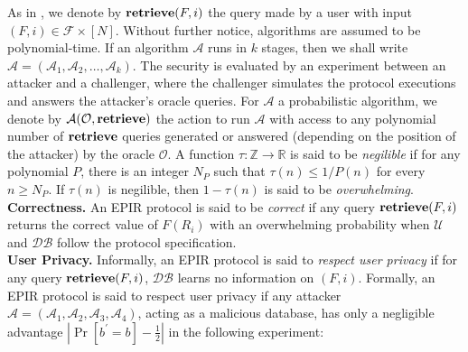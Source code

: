 \documentclass[JMC]{degruyter-journal}
\begin{document}
As in \cite{BC09,BCPT07}, we denote by ${\bf retrieve}(F,i)$ the
query made by a user with input $(F,i)\in \mathcal{F}\times [N]$.
Without further notice, algorithms are assumed to be
polynomial-time. If an algorithm $\mathcal{A}$ runs in $k$
stages,  then we shall write $\mathcal{A} = (\mathcal{A}_1,\mathcal{A}_2,
\ldots, \mathcal{A}_k )$. The security is evaluated by an experiment between an
attacker and a challenger, where the challenger simulates the
protocol executions and answers the attacker's oracle queries.
 For $\mathcal{A}$ a probabilistic algorithm, we denote
by $\mathcal{A}(\mathcal{O}, {\bf retrieve})$
 the action to run $\mathcal{A}$ with access to any polynomial number of ${\bf retrieve}$
 queries
generated or answered (depending on the position of the attacker) by
the oracle $\mathcal{O}$. A function $\tau: \mathbb{Z}\rightarrow
\mathbb{R}$ is said to be {\em negilible} if for any polynomial $P$,
there is an integer $N_P$ such that $\tau(n)\leq 1/P(n)$ for every
$n\geq N_P$. If $\tau(n)$ is  negilible, then $1-\tau(n)$ is said to
be
{\em overwhelming}.\\
{\bf Correctness.} An EPIR protocol is said to be {\em correct} if
any query ${\bf retrieve}(F,i)$
 returns the correct value of $F(R_i)$ with an overwhelming probability when $\mathcal{U}$ and
 $\mathcal{DB}$ follow the protocol specification.\\
{\bf User Privacy.} Informally, an EPIR protocol is said to {\em
respect  user privacy} if for any query ${\bf retrieve}(F, i)$,
$\mathcal{DB}$ learns no information on  $(F,i)$. Formally, an EPIR
protocol is said to respect user privacy if any attacker
$\mathcal{A} = (\mathcal{A}_1, \mathcal{A}_2, \mathcal{A}_3,
\mathcal{A}_4)$, acting as a malicious database, has only a
negligible advantage $|\Pr[b^{\prime}=b]-\frac{1}{2}|$ in the
following experiment:
\end{document}

